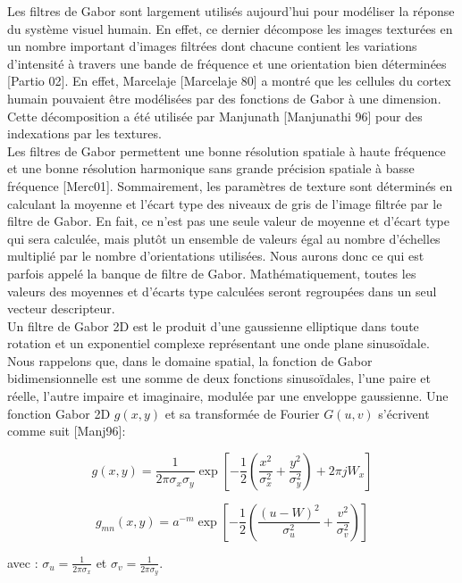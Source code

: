 Les filtres de Gabor sont largement utilisés aujourd’hui pour modéliser la réponse du système visuel humain. En effet, ce dernier décompose les images texturées en un nombre important d'images filtrées dont chacune contient les variations d'intensité à travers une bande de fréquence et une orientation bien déterminées [Partio 02]. En effet, Marcelaje [Marcelaje 80] a montré que les cellules du cortex humain pouvaient être modélisées par des fonctions de Gabor à une dimension. Cette décomposition a été utilisée par Manjunath [Manjunathi 96] pour des indexations par les textures.\\

Les filtres de Gabor permettent une bonne résolution spatiale à haute fréquence et une bonne résolution harmonique sans grande précision spatiale à basse fréquence [Merc01]. Sommairement, les paramètres de texture sont déterminés en calculant la moyenne et l’écart type des niveaux de gris de l’image filtrée par le filtre de Gabor. En fait, ce n’est pas une seule valeur de moyenne et d’écart type qui sera calculée, mais plutôt un ensemble de valeurs égal au nombre d’échelles multiplié par le nombre d’orientations utilisées. Nous aurons donc ce qui est parfois appelé la banque de filtre de Gabor. Mathématiquement, toutes les valeurs des moyennes et d’écarts type calculées seront regroupées dans un seul vecteur descripteur. \\

Un filtre de Gabor 2D est le produit d'une gaussienne elliptique dans toute rotation et un exponentiel complexe représentant une onde plane sinusoïdale. Nous rappelons que, dans le domaine spatial, la fonction de Gabor bidimensionnelle est une somme de deux fonctions sinusoïdales, l'une paire et réelle, l'autre impaire et imaginaire, modulée par une enveloppe gaussienne. Une fonction Gabor 2D $g(x, y)$ et sa transformée de Fourier $G(u, v)$ s'écrivent comme suit [Manj96]:



\begin{equation}
	g(x, y) = \frac{1}{2\pi \sigma_x \sigma_y} \exp\left[-\frac{1}{2} (\frac{x^2}{\sigma_x^2} + \frac{y^2}{\sigma_y^2}) + 2\pi j W_x\right]
\end{equation}

\begin{equation}
	g_{mn}(x, y) = a^{-m} \exp\left[-\frac{1}{2} (\frac{(u-W)^2}{\sigma_u^2} + \frac{v^2}{\sigma_v^2})\right] 
\end{equation}


 avec : $\sigma_u = \frac{1}{2\pi \sigma_x } $ et  $ \sigma_v = \frac{1}{2\pi  \sigma_y} $. \\
 
